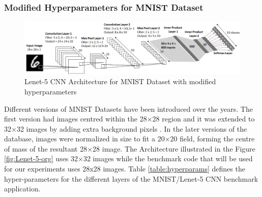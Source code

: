 \subsubsection{Modified Hyperparameters for MNIST Dataset}
\begin{figure}[h!]
  \centering
  \includegraphics[width=\linewidth]{figures/Lenet-5-papaa.PNG}
  \caption{Lenet-5 CNN Architecture for MNIST Dataset with modified hyperparameters
  \cite{papaa-opencl}}
  \label{fig:Lenet-5-MNIST}
\end{figure}
Different versions of MNIST Datasets have been introduced over the years. The first version had images centred within the 28×28 region and it was extended to 32×32 images by adding extra background pixels \cite{lecun1998gradient}. In the later versions of the database, images were normalized in size to fit a 20×20 field, forming the centre of mass of the resultant 28×28 image. The Architecture illustrated in the Figure \ref{fig:Lenet-5-org} uses 32×32 images while the benchmark code \cite{papaa-opencl} that will be used for our experiments uses 28x28 images. Table \ref{table:hyperparams} defines the hyper-parameters for the different layers of the MNIST/Lenet-5 CNN benchmark application\cite{papaa-opencl}.
